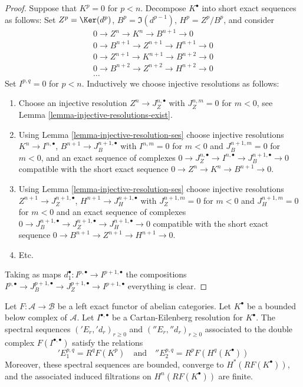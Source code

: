 \begin{proof}
Suppose that $K^p = 0$ for $p < n$. Decompose $K^\bullet$ into
short exact sequences as follows: Set $Z^p = \Ker(d^p)$,
$B^p = \Im(d^{p - 1})$, $H^p = Z^p/B^p$, and consider
$$
\begin{matrix}
0 \to Z^n \to K^n \to B^{n + 1} \to 0 \\
0 \to B^{n + 1} \to Z^{n + 1} \to H^{n + 1} \to 0 \\
0 \to Z^{n + 1} \to K^{n + 1} \to B^{n + 2} \to 0 \\
0 \to B^{n + 2} \to Z^{n + 2} \to H^{n + 2} \to 0 \\
\ldots
\end{matrix}
$$
Set $I^{p, q} = 0$ for $p < n$. Inductively we choose
injective resolutions as follows:
\begin{enumerate}
\item Choose an injective resolution $Z^n \to J_Z^{n, \bullet}$
with $J_Z^{n, m} = 0$ for $m < 0$, see
Lemma \ref{lemma-injective-resolutions-exist}.
\item Using Lemma \ref{lemma-injective-resolution-ses} choose injective
resolutions $K^n \to I^{n, \bullet}$, $B^{n + 1} \to J_B^{n + 1, \bullet}$
with $I^{n, m} = 0$ for $m < 0$ and $J_B^{n + 1, m} = 0$ for $m < 0$,
and an exact sequence of complexes
$0 \to J_Z^{n, \bullet} \to I^{n, \bullet} \to J_B^{n + 1, \bullet} \to 0$
compatible with the short exact sequence
$0 \to Z^n \to K^n \to B^{n + 1} \to 0$.
\item Using Lemma \ref{lemma-injective-resolution-ses} choose injective
resolutions $Z^{n + 1} \to J_Z^{n + 1, \bullet}$,
$H^{n + 1} \to J_H^{n + 1, \bullet}$
with $J_Z^{n + 1, m} = 0$ for $m < 0$ and $J_H^{n + 1, m} = 0$ for $m < 0$
and an exact sequence of complexes
$0 \to J_B^{n + 1, \bullet} \to J_Z^{n + 1, \bullet}
\to J_H^{n + 1, \bullet} \to 0$
compatible with the short exact sequence
$0 \to B^{n + 1} \to Z^{n + 1} \to H^{n + 1} \to 0$.
\item Etc.
\end{enumerate}
Taking as maps $d_1^\bullet : I^{p, \bullet} \to I^{p + 1, \bullet}$
the compositions
$I^{p, \bullet} \to J_B^{p + 1, \bullet} \to
J_Z^{p + 1, \bullet} \to I^{p + 1, \bullet}$ everything is clear.
\end{proof}

\begin{lemma}
\label{lemma-two-ss-complex-functor}
Let $F : \mathcal{A} \to \mathcal{B}$ be a left exact functor of
abelian categories.
Let $K^\bullet$ be a bounded below complex of $\mathcal{A}$.
Let $I^{\bullet, \bullet}$ be a Cartan-Eilenberg resolution
for $K^\bullet$. The spectral sequences
$({}'E_r, {}'d_r)_{r \geq 0}$ and $({}''E_r, {}''d_r)_{r \geq 0}$
associated to the double complex $F(I^{\bullet, \bullet})$
satisfy the relations
$$
{}'E_1^{p, q} = R^qF(K^p)
\quad
\text{and}
\quad
{}''E_2^{p, q} = R^pF(H^q(K^\bullet))
$$
Moreover, these spectral sequences are bounded, converge to
$H^*(RF(K^\bullet))$, and the associated induced filtrations on
$H^n(RF(K^\bullet))$ are finite.
\end{lemma}

